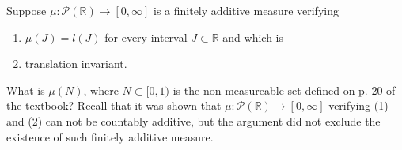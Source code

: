 \documentclass[12pt]{article}
\newenvironment{problem}[2][Problem]{\begin{trivlist}
    \item[\hskip \labelsep {\bfseries #1}\hskip \labelsep {\bfseries #2.}]}{\end{trivlist}}
\theoremstyle{definition}
\begin{document}
\begin{problem}{5}
  Suppose \(\mu: \mathcal{P}(\mathbb{R}) \rightarrow [0, \infty]\) is a finitely additive measure verifying
  \begin{enumerate}
    \item \(\mu(J) = l(J)\) for every interval \( J \subset \mathbb{R} \) and which is
    \item translation invariant.
  \end{enumerate}
  What is \(\mu(N)\), where \( N \subset [0,1) \) is the non-measureable set defined on p. 20 of the textbook?
  Recall that it was shown that \(\mu: \mathcal{P}(\mathbb{R}) \rightarrow [0, \infty]\) verifying (1) and (2) can not be countably additive, but the argument did not exclude the existence of such finitely additive measure.
\end{problem}
\end{document}
